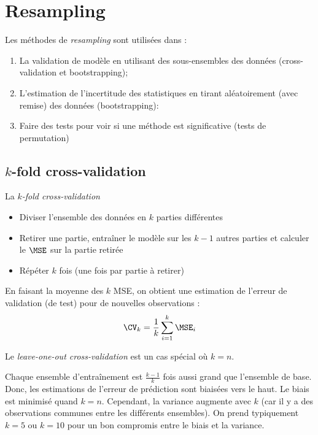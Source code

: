 \section{Resampling}
    \begin{definition}
        Les méthodes de \textit{resampling} sont utilisées dans :
        \begin{enumerate}
            \item La validation de modèle en utilisant des sous-ensembles des données (cross-validation et bootstrapping);
            \item L'estimation de l'incertitude des statistiques en tirant aléatoirement (avec remise) des données (bootstrapping):
            \item Faire des tests pour voir si une méthode est significative (tests de permutation)
        \end{enumerate}
    \end{definition}

    \subsection{\(k\)-fold cross-validation}
        \begin{definition}
            La \textit{\(k\)-fold cross-validation}
            \begin{itemize}
                \item Diviser l'ensemble des données en \(k\) parties différentes
                \item Retirer une partie, entraîner le modèle sur les \(k - 1\) autres parties et calculer le \(\MSE\) sur la partie retirée
                \item Répéter \(k\) fois (une fois par partie à retirer)
            \end{itemize}

            En faisant la moyenne des \(k\) MSE, on obtient une estimation de l'erreur de validation (de test) pour de nouvelles observations :
            \[
                \CV_{k} = \frac{1}{k} \sum_{i=1}^k \MSE_i
            \]

            Le \textit{leave-one-out cross-validation} est un cas spécial où \(k = n\).
        \end{definition}

        Chaque ensemble d'entraînement est \(\frac{k - 1}{k}\) fois aussi grand que l'ensemble de base. Donc, les estimations de l'erreur de prédiction sont biaisées vers le haut. Le biais est minimisé quand \(k = n\). Cependant, la variance augmente avec \(k\) (car il y a des observations communes entre les différents ensembles). On prend typiquement \(k = 5\) ou \(k = 10\) pour un bon compromis entre le biais et la variance.


